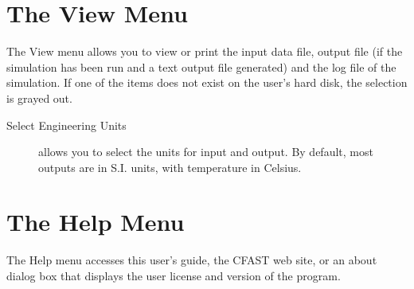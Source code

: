 \section{The View Menu}

The View menu allows you to view or print the input data file, output file (if the simulation has been run and a text output file generated) and the log file of the simulation. If one of the items does not exist on the user's hard disk, the selection is grayed out.
\begin{description}
\item[Select Engineering Units] allows you to select the units for input and output. By default, most outputs are in S.I. units, with temperature in Celsius.
\end{description}


\section{The Help Menu}

The Help menu accesses this user's guide, the CFAST web site, or an about dialog box that displays the user license and version of the program.







